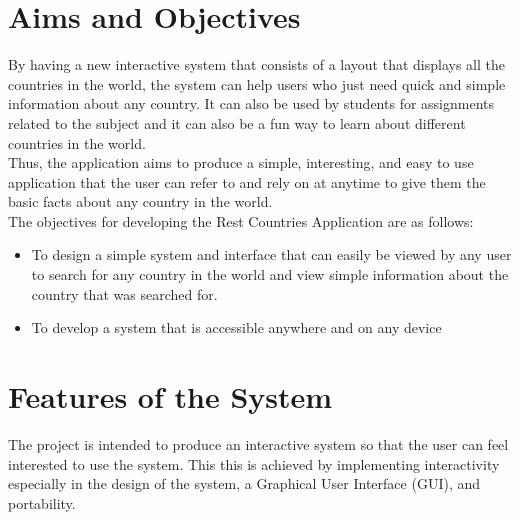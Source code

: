 \documentclass[twoside, a4paper, 12pt]{report}
\begin{document}

\section{Aims and Objectives}
By having a new interactive system that consists of a layout that displays all the countries in the world, the system can help users who just need quick and simple information about any country. It can also be used by students for assignments related to the subject and it can also be a fun way to learn about different countries in the world.\\
\indent
Thus, the application aims to produce a simple, interesting, and easy to use application that the user can refer to and rely on at anytime to give them the basic facts about any country in the world.\\
\indent
The objectives for developing the Rest Countries Application are as follows:
\begin{itemize}
\item To design a simple system and interface that can easily be viewed by any user to search for any country in the world and view simple information about the country that was searched for.
\item To develop a system that is accessible anywhere and on any device
\end{itemize}

\section{Features of the System}
The project is intended to produce an interactive system so that the user can feel interested to use the system. This this is achieved by implementing interactivity especially in the design of the system, a Graphical User Interface (GUI), and portability.
\end{document}
